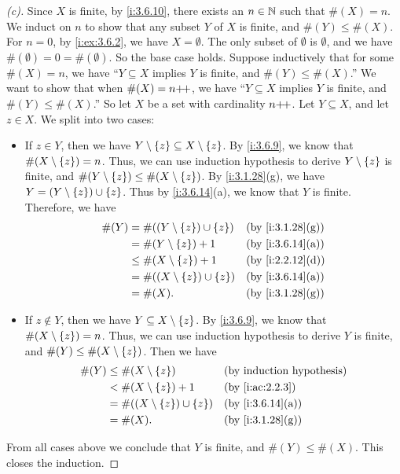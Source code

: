 \begin{proof}[(c)]
  Since \(X\) is finite, by \cref{i:3.6.10}, there exists an \(n \in \mathbb{N}\) such that \(\#(X) = n\).
  We induct on \(n\) to show that any subset \(Y\) of \(X\) is finite, and \(\#(Y) \leq \#(X)\).
  For \(n = 0\), by \cref{i:ex:3.6.2}, we have \(X = \emptyset\).
  The only subset of \(\emptyset\) is \(\emptyset\), and we have \(\#(\emptyset) = 0 = \#(\emptyset)\).
  So the base case holds.
  Suppose inductively that for some \(\#(X) = n\), we have ``\(Y \subseteq X\) implies \(Y\) is finite, and \(\#(Y) \leq \#(X)\).''
  We want to show that when \(\#(X) = n{+}\!{+}\), we have ``\(Y \subseteq X\) implies \(Y\) is finite, and \(\#(Y) \leq \#(X)\).''
  So let \(X\) be a set with cardinality \(n{+}\!{+}\).
  Let \(Y \subseteq X\), and let \(z \in X\).
  We split into two cases:
  \begin{itemize}
    \item If \(z \in Y\), then we have \(Y \setminus \left\lbrace z\right\rbrace \subseteq X \setminus \left\lbrace z\right\rbrace\).
          By \cref{i:3.6.9}, we know that \(\#(X \setminus \left\lbrace z\right\rbrace) = n\).
          Thus, we can use induction hypothesis to derive \(Y \setminus \left\lbrace z\right\rbrace\) is finite, and \(\#(Y \setminus \left\lbrace z\right\rbrace) \leq \#(X \setminus \left\lbrace z\right\rbrace)\).
          By \cref{i:3.1.28}(g), we have \(Y = (Y \setminus \left\lbrace z\right\rbrace) \cup \left\lbrace z\right\rbrace\).
          Thus by \cref{i:3.6.14}(a), we know that \(Y\) is finite.
          Therefore, we have
          \begin{align*}
            \#(Y) & = \#((Y \setminus \set{z}) \cup \set{z}) &  & \by{i:3.1.28}[g] \\
                  & = \#(Y \setminus \set{z}) + 1            &  & \by{i:3.6.14}[a] \\
                  & \leq \#(X \setminus \set{z}) + 1         &  & \by{i:2.2.12}[d] \\
                  & = \#((X \setminus \set{z}) \cup \set{z}) &  & \by{i:3.6.14}[a] \\
                  & = \#(X).                                 &  & \by{i:3.1.28}[g]
          \end{align*}
    \item If \(z \notin Y\), then we have \(Y \subseteq X \setminus \left\lbrace z\right\rbrace\).
          By \cref{i:3.6.9}, we know that \(\#(X \setminus \left\lbrace z\right\rbrace) = n\).
          Thus, we can use induction hypothesis to derive \(Y\) is finite, and \(\#(Y) \leq \#(X \setminus \left\lbrace z\right\rbrace)\).
          Then we have
          \begin{align*}
            \#(Y) & \leq \#(X \setminus \set{z})             &  & \byIH            \\
                  & < \#(X \setminus \set{z}) + 1            &  & \by{i:ac:2.2.3}  \\
                  & = \#((X \setminus \set{z}) \cup \set{z}) &  & \by{i:3.6.14}[a] \\
                  & = \#(X).                                 &  & \by{i:3.1.28}[g]
          \end{align*}
  \end{itemize}
  From all cases above we conclude that \(Y\) is finite, and \(\#(Y) \leq \#(X)\).
  This closes the induction.


\end{proof}
